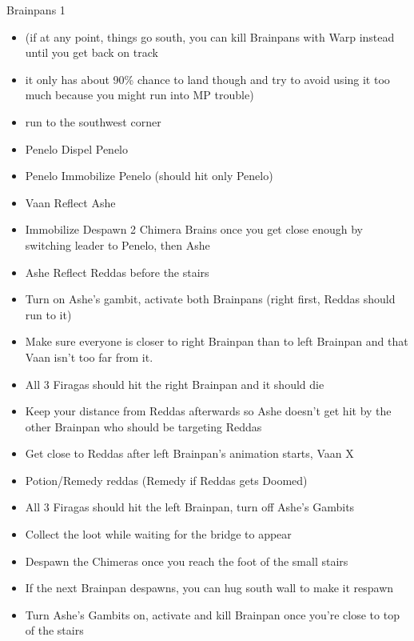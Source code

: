 		      \begin{gambit}
			      \begin{itemize}
			      \end{itemize}
		      \end{gambit}
\begin{battle}{Brainpans 1}
\begin{itemize}
\item (if at any point, things go south, you can kill Brainpans with Warp instead until you get back on track \item  it only has about 90\% chance to land though and try to avoid using it too much because you might run into MP trouble)
	\item  run to the southwest corner
	\item  Penelo Dispel Penelo
	\item  Penelo Immobilize Penelo (should hit only Penelo)
	\item  Vaan Reflect Ashe
	\item  Immobilize Despawn 2 Chimera Brains once you get close enough by switching leader to Penelo, then Ashe
	\item  Ashe Reflect Reddas before the stairs
	\item  Turn on Ashe's gambit, activate both Brainpans (right first, Reddas should run to it)
	\item  Make sure everyone is closer to right Brainpan than to left Brainpan and that Vaan isn't too far from it.
		\item  All 3 Firagas should hit the right Brainpan and it should die
		\item  Keep your distance from Reddas afterwards so Ashe doesn't get hit by the other Brainpan who should be targeting Reddas
	\item  Get close to Reddas after left Brainpan's animation starts, Vaan X\item Potion/Remedy reddas (Remedy if Reddas gets Doomed)
		\item  All 3 Firagas should hit the left Brainpan, turn off Ashe's Gambits
		\item  Collect the loot while waiting for the bridge to appear
	\item  Despawn the Chimeras once you reach the foot of the small stairs
		\item  If the next Brainpan despawns, you can hug south wall to make it respawn
	\item  Turn Ashe's Gambits on, activate and kill Brainpan once you're close to top of the stairs

\end{itemize}
\end{battle}
